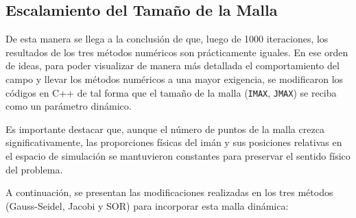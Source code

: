 \subsection{Escalamiento del Tamaño de la Malla}
De esta manera se llega a la conclusión de que, luego de 1000 iteraciones, los resultados de los tres métodos numéricos son prácticamente iguales. En ese orden de ideas, para poder visualizar de manera más detallada el comportamiento del campo y llevar los métodos numéricos a una mayor exigencia, se modificaron los códigos en C++ de tal forma que el tamaño de la malla (\texttt{IMAX}, \texttt{JMAX}) se reciba como un parámetro dinámico. 

Es importante destacar que, aunque el número de puntos de la malla crezca significativamente, las proporciones físicas del imán y sus posiciones relativas en el espacio de simulación se mantuvieron constantes para preservar el sentido físico del problema.

A continuación, se presentan las modificaciones realizadas en los tres métodos (Gauss-Seidel, Jacobi y SOR) para incorporar esta malla dinámica:

